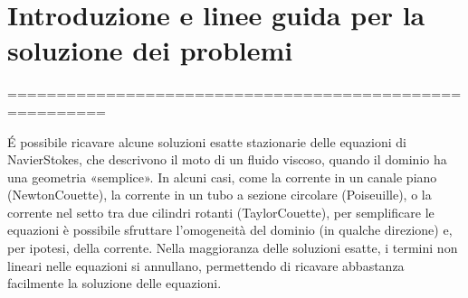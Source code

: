 \documentclass[letterpaper,10pt,italian]{jupyterBook}
\begin{document}
\section{Introduzione e linee guida per la soluzione dei problemi}
\label{\detokenize{polimi/fluidmechanics-ita/template/capitoli/06_slnEsatte/0600in:introduzione-e-linee-guida-per-la-soluzione-dei-problemi}}
\sphinxAtStartPar
========================================================

\sphinxAtStartPar
É possibile ricavare alcune soluzioni esatte stazionarie delle equazioni
di Navier\sphinxhyphen{}Stokes, che descrivono il moto di un fluido viscoso, quando il
dominio ha una geometria «semplice». In alcuni casi, come la corrente in
un canale piano (Newton\sphinxhyphen{}Couette), la corrente in un tubo a sezione
circolare (Poiseuille), o la corrente nel setto tra due cilindri rotanti
(Taylor\sphinxhyphen{}Couette), per semplificare le equazioni è possibile sfruttare
l’omogeneità del dominio (in qualche direzione) e, per ipotesi, della
corrente. Nella maggioranza delle soluzioni esatte, i termini non
lineari nelle equazioni si annullano, permettendo di ricavare abbastanza
facilmente la soluzione delle equazioni.
\end{document}
